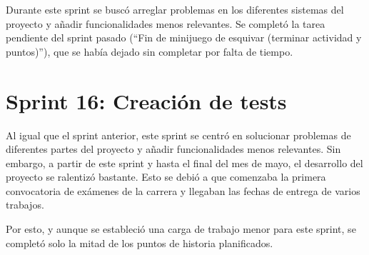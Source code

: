 Durante este sprint se buscó arreglar problemas en los diferentes sistemas del proyecto y
añadir funcionalidades menos relevantes. Se completó la tarea pendiente del sprint pasado
(\enquote{Fin de minijuego de esquivar (terminar actividad y puntos)}), que se había dejado sin
completar por falta de tiempo.




\section{Sprint 16: Creación de tests}
\label{anexo3:sec:sprint16}

Al igual que el sprint anterior, este sprint se centró en solucionar problemas de diferentes partes
del proyecto y añadir funcionalidades menos relevantes. Sin embargo, a partir de este sprint y
hasta el final del mes de mayo, el desarrollo del proyecto se ralentizó bastante. Esto se debió
a que comenzaba la primera convocatoria de exámenes de la carrera y llegaban las fechas de entrega
de varios trabajos.

Por esto, y aunque se estableció una carga de trabajo menor para este sprint, se completó solo la
mitad de los puntos de historia planificados.

